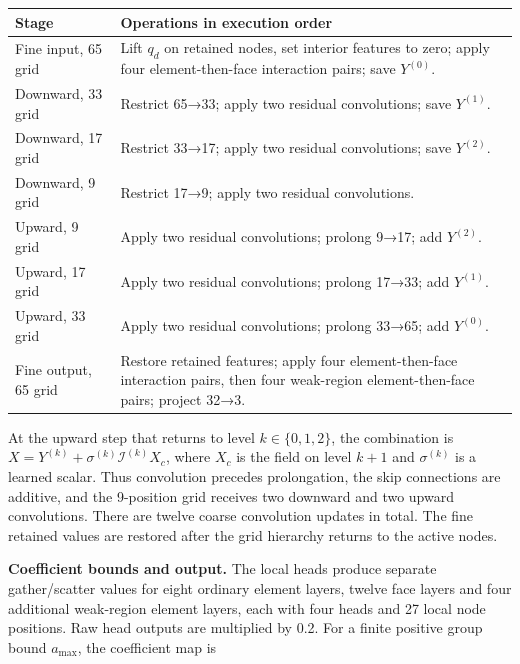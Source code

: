 \documentclass[preprint,12pt,authoryear]{elsarticle}
\def\LTcaptype{table}
\begin{document}
{\def\LTcaptype{} %
{\small
\begin{longtable}[]{@{}
  >{\raggedright\arraybackslash}p{}
  >{\raggedright\arraybackslash}p{}@{}}
\toprule\noalign{}
\begin{minipage}[b]{\linewidth}\raggedright
Stage
\end{minipage} & \begin{minipage}[b]{\linewidth}\raggedright
Operations in execution order
\end{minipage} \\
\midrule\noalign{}
\endhead
\bottomrule\noalign{}
\endlastfoot
Fine input, 65 grid & Lift \(q_d\) on retained nodes, set interior features to zero; apply four element-then-face interaction pairs; save \(Y^{(0)}\). \\
Downward, 33 grid & Restrict 65→33; apply two residual convolutions; save \(Y^{(1)}\). \\
Downward, 17 grid & Restrict 33→17; apply two residual convolutions; save \(Y^{(2)}\). \\
Downward, 9 grid & Restrict 17→9; apply two residual convolutions. \\
Upward, 9 grid & Apply two residual convolutions; prolong 9→17; add \(Y^{(2)}\). \\
Upward, 17 grid & Apply two residual convolutions; prolong 17→33; add \(Y^{(1)}\). \\
Upward, 33 grid & Apply two residual convolutions; prolong 33→65; add \(Y^{(0)}\). \\
Fine output, 65 grid & Restore retained features; apply four element-then-face interaction pairs, then four weak-region element-then-face pairs; project 32→3. \\
\end{longtable}}
}

At the upward step that returns to level \(k\in\{0,1,2\}\), the combination is \(X=Y^{(k)}+\sigma^{(k)}\mathcal I^{(k)}X_c\), where \(X_c\) is the field on level \(k+1\) and \(\sigma^{(k)}\) is a learned scalar. Thus convolution precedes prolongation, the skip connections are additive, and the 9-position grid receives two downward and two upward convolutions. There are twelve coarse convolution updates in total. The fine retained values are restored after the grid hierarchy returns to the active nodes.

\textbf{Coefficient bounds and output.} The local heads produce separate gather/scatter values for eight ordinary element layers, twelve face layers and four additional weak-region element layers, each with four heads and 27 local node positions. Raw head outputs are multiplied by 0.2. For a finite positive group bound \(a_{\max}\), the coefficient map is
\end{document}
